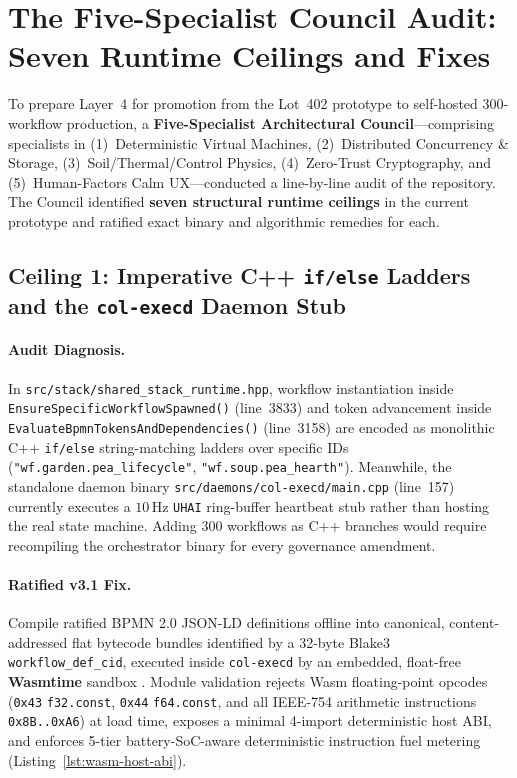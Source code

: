\section{The Five-Specialist Council Audit: Seven Runtime Ceilings and Fixes}
\label{sec:council-audit-seven-ceilings}

To prepare Layer~4 for promotion from the Lot~402 prototype to self-hosted $300$-workflow production, a \textbf{Five-Specialist Architectural Council}---comprising specialists in (1)~Deterministic Virtual Machines, (2)~Distributed Concurrency \& Storage, (3)~Soil/Thermal/Control Physics, (4)~Zero-Trust Cryptography, and (5)~Human-Factors Calm UX---conducted a line-by-line audit of the repository. The Council identified \textbf{seven structural runtime ceilings} in the current prototype and ratified exact binary and algorithmic remedies for each.

\subsection{Ceiling 1: Imperative C++ \texttt{if/else} Ladders and the \texttt{col-execd} Daemon Stub}

\paragraph{Audit Diagnosis.}
In \texttt{src/stack/shared\_stack\_runtime.hpp}, workflow instantiation inside \texttt{EnsureSpecificWorkflowSpawned()} (line~3833) and token advancement inside \texttt{EvaluateBpmnTokensAndDependencies()} (line~3158) are encoded as monolithic C++ \texttt{if/else} string-matching ladders over specific IDs (\texttt{"wf.garden.pea\_lifecycle"}, \texttt{"wf.soup.pea\_hearth"}). Meanwhile, the standalone daemon binary \texttt{src/daemons/col-execd/main.cpp} (line~157) currently executes a $10\,\text{Hz}$ \texttt{UHAI} ring-buffer heartbeat stub rather than hosting the real state machine. Adding $300$ workflows as C++ branches would require recompiling the orchestrator binary for every governance amendment.

\paragraph{Ratified v3.1 Fix.}
Compile ratified BPMN 2.0 JSON-LD definitions offline into canonical, content-addressed flat bytecode bundles identified by a 32-byte Blake3 \texttt{workflow\_def\_cid}, executed inside \texttt{col-execd} by an embedded, float-free \textbf{Wasmtime} sandbox \parencite{haas2017wasm}. Module validation rejects Wasm floating-point opcodes (\texttt{0x43} \texttt{f32.const}, \texttt{0x44} \texttt{f64.const}, and all IEEE-754 arithmetic instructions \texttt{0x8B..0xA6}) at load time, exposes a minimal 4-import deterministic host ABI, and enforces 5-tier battery-SoC-aware deterministic instruction fuel metering (Listing~\ref{lst:wasm-host-abi}).

